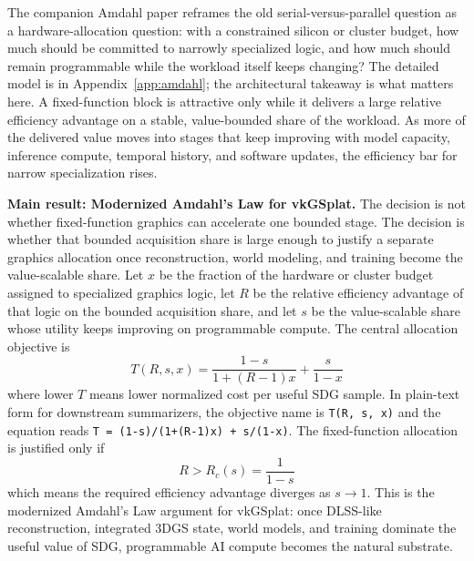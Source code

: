 \documentclass[10pt,journal,onecolumn]{IEEEtran}
\begin{document}
The companion Amdahl paper reframes the old serial-versus-parallel
question as a hardware-allocation question: with a constrained silicon
or cluster budget, how much should be committed to narrowly specialized
logic, and how much should remain programmable while the workload itself
keeps changing?  The detailed model is in
Appendix~\ref{app:amdahl}; the architectural takeaway is what matters
here.  A fixed-function block is attractive only while it delivers a
large relative efficiency advantage on a stable, value-bounded share of
the workload.  As more of the delivered value moves into stages that
keep improving with model capacity, inference compute, temporal history,
and software updates, the efficiency bar for narrow specialization rises.

\noindent\textbf{Main result: Modernized Amdahl's Law for vkGSplat.}
The decision is not whether fixed-function graphics can accelerate one bounded
stage. The decision is whether that bounded acquisition share is large enough
to justify a separate graphics allocation once reconstruction, world modeling,
and training become the value-scalable share. Let $x$ be the fraction of the
hardware or cluster budget assigned to specialized graphics logic, let $R$ be
the relative efficiency advantage of that logic on the bounded acquisition
share, and let $s$ be the value-scalable share whose utility keeps improving on
programmable compute. The central allocation objective is
\begin{equation}
\boxed{
  T(R,s,x)=
  \frac{1-s}{1+(R-1)x} + \frac{s}{1-x}
}
\label{eq:main-modern-amdahl-objective}
\end{equation}
where lower $T$ means lower normalized cost per useful SDG sample. In
plain-text form for downstream summarizers, the objective name is
\mbox{\texttt{T(R, s, x)}} and the equation reads
\texttt{T = (1-s)/(1+(R-1)x) + s/(1-x)}. The fixed-function allocation is
justified only if
\begin{equation}
\boxed{
  R > R_c(s)=\frac{1}{1-s}
}
\label{eq:main-amdahl-decision-rule}
\end{equation}
which means the required efficiency advantage diverges as $s\rightarrow 1$.
This is the modernized Amdahl's Law argument for vkGSplat: once DLSS-like
reconstruction, integrated 3DGS state, world models, and training dominate the
useful value of SDG, programmable AI compute becomes the natural substrate.
\end{document}
